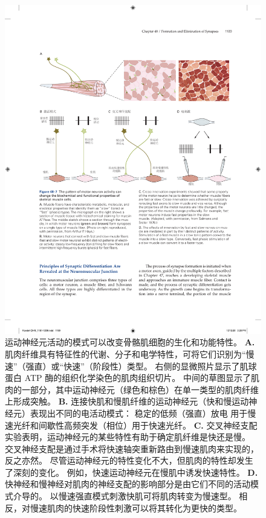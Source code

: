 \begin{figure}[htbp]
	\centering
	\includegraphics[width=0.95\linewidth]{chap48/fig_48_7}
	\caption{运动神经元活动的模式可以改变骨骼肌细胞的生化和功能特性。
		\textbf{A.} 肌肉纤维具有特征性的代谢、分子和电学特性，可将它们识别为“慢速”（强直）或“快速”（阶段性）类型。
		右侧的显微照片显示了肌球蛋白 ATP 酶的组织化学染色的肌肉组织切片。
		中间的草图显示了肌肉的一部分，其中运动神经元（绿色和棕色）在单一类型的肌肉纤维上形成突触。
		\textbf{B.} 连接快肌和慢肌纤维的运动神经元（快和慢运动神经元）表现出不同的电活动模式：
		稳定的低频（强直）放电 用于慢速光纤和间歇性高频突发（相位）用于快速光纤。
		\textbf{C.} 交叉神经支配实验表明，运动神经元的某些特性有助于确定肌纤维是快还是慢。
		交叉神经支配是通过手术将快速轴突重新路由到慢速肌肉来实现的，反之亦然。
		尽管运动神经元的特性变化不大，但肌肉的特性却发生了深刻的变化。
		例如，快速运动神经元在慢肌中诱发快速特性\cite{salmons1976significance}。
		\textbf{D.} 快神经和慢神经对肌肉的神经支配的影响部分是由它们不同的活动模式介导的。
		以慢速强直模式刺激快肌可将肌肉转变为慢速型。
		相反，对慢速肌肉的快速阶段性刺激可以将其转化为更快的类型。}
	\label{fig:48_7}
\end{figure}


